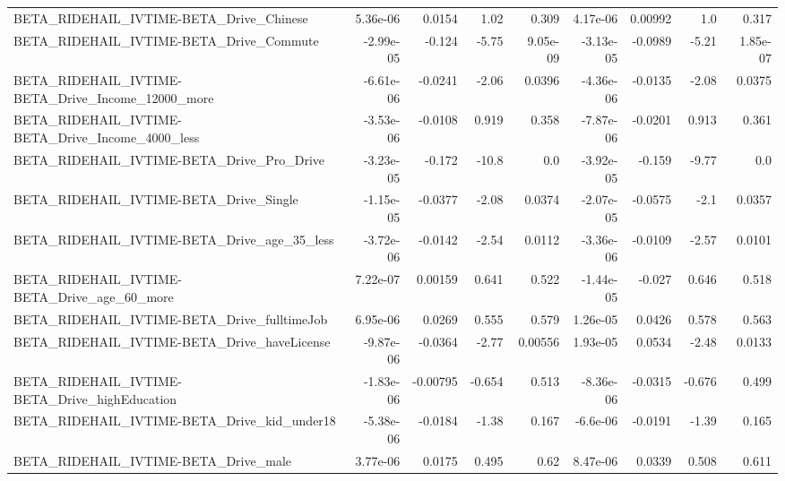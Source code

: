 \begin{tabular}{lrrrrrrrr}
BETA\_RIDEHAIL\_IVTIME-BETA\_Drive\_Chinese            &    5.36e-06 &       0.0154 &      1.02 &    0.309 &   4.17e-06 &     0.00992 &          1.0 &         0.317 \\
BETA\_RIDEHAIL\_IVTIME-BETA\_Drive\_Commute            &   -2.99e-05 &       -0.124 &     -5.75 & 9.05e-09 &  -3.13e-05 &     -0.0989 &        -5.21 &      1.85e-07 \\
BETA\_RIDEHAIL\_IVTIME-BETA\_Drive\_Income\_12000\_more  &   -6.61e-06 &      -0.0241 &     -2.06 &   0.0396 &  -4.36e-06 &     -0.0135 &        -2.08 &        0.0375 \\
BETA\_RIDEHAIL\_IVTIME-BETA\_Drive\_Income\_4000\_less   &   -3.53e-06 &      -0.0108 &     0.919 &    0.358 &  -7.87e-06 &     -0.0201 &        0.913 &         0.361 \\
BETA\_RIDEHAIL\_IVTIME-BETA\_Drive\_Pro\_Drive          &   -3.23e-05 &       -0.172 &     -10.8 &      0.0 &  -3.92e-05 &      -0.159 &        -9.77 &           0.0 \\
BETA\_RIDEHAIL\_IVTIME-BETA\_Drive\_Single             &   -1.15e-05 &      -0.0377 &     -2.08 &   0.0374 &  -2.07e-05 &     -0.0575 &         -2.1 &        0.0357 \\
BETA\_RIDEHAIL\_IVTIME-BETA\_Drive\_age\_35\_less        &   -3.72e-06 &      -0.0142 &     -2.54 &   0.0112 &  -3.36e-06 &     -0.0109 &        -2.57 &        0.0101 \\
BETA\_RIDEHAIL\_IVTIME-BETA\_Drive\_age\_60\_more        &    7.22e-07 &      0.00159 &     0.641 &    0.522 &  -1.44e-05 &      -0.027 &        0.646 &         0.518 \\
BETA\_RIDEHAIL\_IVTIME-BETA\_Drive\_fulltimeJob        &    6.95e-06 &       0.0269 &     0.555 &    0.579 &   1.26e-05 &      0.0426 &        0.578 &         0.563 \\
BETA\_RIDEHAIL\_IVTIME-BETA\_Drive\_haveLicense        &   -9.87e-06 &      -0.0364 &     -2.77 &  0.00556 &   1.93e-05 &      0.0534 &        -2.48 &        0.0133 \\
BETA\_RIDEHAIL\_IVTIME-BETA\_Drive\_highEducation      &   -1.83e-06 &     -0.00795 &    -0.654 &    0.513 &  -8.36e-06 &     -0.0315 &       -0.676 &         0.499 \\
BETA\_RIDEHAIL\_IVTIME-BETA\_Drive\_kid\_under18        &   -5.38e-06 &      -0.0184 &     -1.38 &    0.167 &   -6.6e-06 &     -0.0191 &        -1.39 &         0.165 \\
BETA\_RIDEHAIL\_IVTIME-BETA\_Drive\_male               &    3.77e-06 &       0.0175 &     0.495 &     0.62 &   8.47e-06 &      0.0339 &        0.508 &         0.611 \\

\end{tabular}
